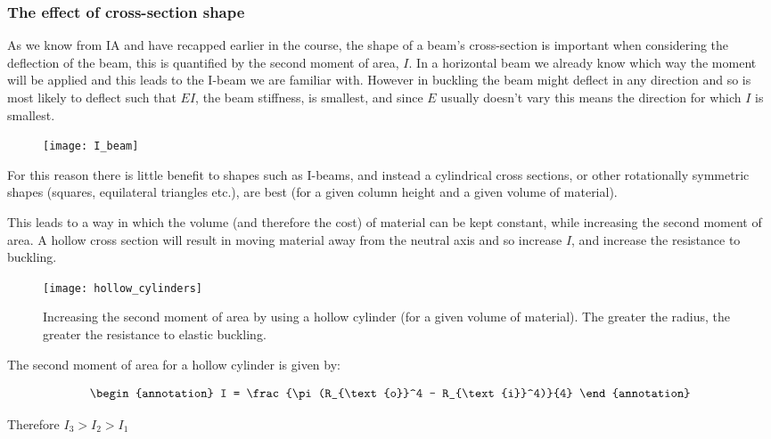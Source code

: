 \subsubsection{The effect of cross-section shape}

As we know from IA and have recapped earlier in the course, the shape of a beam's cross-section is important when considering the deflection of the beam, this is quantified by the second moment of area, $I$. In a horizontal beam we already know which way the moment will be applied and this leads to the I-beam we are familiar with. However in buckling the beam might deflect in any direction and so is most likely to deflect such that $EI$, the beam stiffness, is smallest, and since $E$ usually doesn't vary this means the direction for which $I$ is smallest.

\FloatBarrier

\begin{figure}[h!t]
\centering
\texttt{[image: I\_beam]}
\end{figure}
\FloatBarrier


For this reason there is little benefit to shapes such as I-beams, and instead a cylindrical cross sections, or other rotationally symmetric shapes (squares, equilateral triangles etc.), are best (for a given column height and a given volume of material).

This leads to a way in which the volume (and therefore the cost) of material can be kept constant, while increasing the second moment of area. A hollow cross section will result in moving material away from the neutral axis and so increase $I$, and increase the resistance to buckling.

\FloatBarrier
\begin{figure}[h!b]
    \centering
    \texttt{[image: hollow\_cylinders]}
    \caption{Increasing the second moment of area by using a hollow cylinder (for a given volume of material). The greater the radius, the greater the resistance to elastic buckling.\label{fig:my_label}}
\end{figure}

The second moment of area for a hollow cylinder is given by:

\begin{equation}
    \begin{annotation}
    I = \frac{\pi (R_{\text{o}}^4 - R_{\text{i}}^4)}{4}
    \end{annotation}
\end{equation}
\begin{annotation}
Therefore $I_3 > I_2 > I_1$
\end{annotation}

